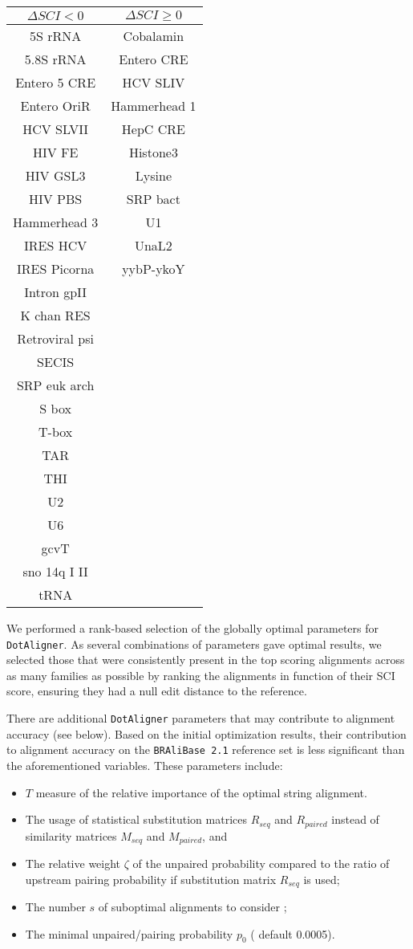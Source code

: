 \documentclass[a4paper,twoside]{article}
\newcommand\dotaligner{\texttt{DotAligner}}
\newcommand\bralibase{\texttt{BRAliBase 2.1}}
\begin{document}
\begin{tabular}{|c|c|}
\hline 
$\Delta{} SCI < 0$  & $\Delta{} SCI \geq 0$ \\ 
\hline 
5S rRNA & Cobalamin \\
5.8S rRNA & Entero CRE \\
Entero 5 CRE & HCV SLIV \\
Entero OriR & Hammerhead 1 \\
HCV SLVII & HepC CRE \\
HIV FE & Histone3 \\
HIV GSL3 & Lysine\\
HIV PBS & SRP bact \\
Hammerhead 3 & U1 \\
IRES HCV & UnaL2 \\
IRES Picorna & yybP-ykoY \\
Intron gpII & \\
K chan RES & \\
Retroviral psi & \\
SECIS & \\
SRP euk arch & \\
S box & \\
T-box & \\
TAR & \\
THI & \\
U2 & \\
U6 & \\
gcvT & \\
sno 14q I II & \\
tRNA & \\
\hline 
\end{tabular} 

We performed a rank-based selection of the globally optimal parameters for \dotaligner{}. 
As several combinations of parameters gave optimal results, we selected those that were 
consistently present in the top scoring alignments across as many families as possible by 
ranking the alignments in function of their SCI score, ensuring they had a null edit distance 
to the reference.  


There are additional \dotaligner{} parameters that may contribute to alignment 
accuracy (see below). Based on the initial optimization results, their contribution
to alignment accuracy on the \bralibase{} reference set is less significant than the
aforementioned variables. These parameters include: 
\begin{itemize}
	\item $T$ measure of the relative importance of the optimal string alignment.
	\item The usage of statistical substitution matrices $R_{seq}$ and $R_{paired}$ instead of  similarity matrices $M_{seq}$ and $M_{paired}$, and
	\item The relative weight $\zeta$ of the unpaired probability compared to the 
	ratio of upstream pairing probability if substitution matrix $R_{seq}$ is used;
	\item The number $s$ of suboptimal alignments to consider ;
	\item The minimal unpaired/pairing probability $p_0$ ( default 0.0005).
\end{itemize}
\end{document}
